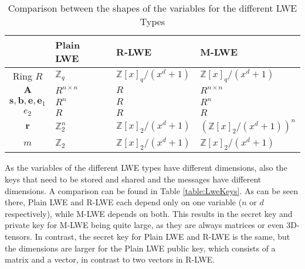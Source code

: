 \begin{table}[htbp]
  \caption[LWE variables shape comparison]{Comparison between the shapes of the variables for the different LWE Types}
  \label{table:LweDiffs}
  \centering
  \begin{tabular}{|c|l|l|l|}
    \hline
                                                    & Plain LWE        & R-LWE                     & M-LWE                         \\
    \hline
    Ring $R$                                        & $\mathbb{Z}_q$   & $\mathbb{Z}[x]_q/(x^d+1)$ & $\mathbb{Z}[x]_q/(x^d+1)$     \\
    $\textbf{A}$                                    & $R^{n\times n}$  & $R$                       & $R^{n\times n}$               \\
    $\textbf{s},\textbf{b},\textbf{e},\textbf{e}_1$ & $R^{n}$          & $R$                       & $R^{n}$                       \\
    $e_2$                                           & $R$              & $R$                       & $R$                           \\
    $\textbf{r}$                                    & $\mathbb{Z}_2^n$ & $\mathbb{Z}[x]_2/(x^d+1)$ & $(\mathbb{Z}[x]_2/(x^d+1))^n$ \\
    $m$                                             & $\mathbb{Z}_2$   & $\mathbb{Z}[x]_2/(x^d+1)$ & $\mathbb{Z}[x]_2/(x^d+1)$     \\
    \hline
  \end{tabular}
\end{table}

As the variables of the different LWE types have different dimensions, also the keys that need to be stored and shared and the messages have different dimensions. A comparison can be found in Table \ref{table:LweKeys}. As can be seen there, Plain LWE and R-LWE each depend only on one variable ($n$ or $d$ respectively), while M-LWE depends on both. This results in the secret key and private key for M-LWE being quite large, as they are always matrices or even 3D-tensors. In contrast, the secret key for Plain LWE and R-LWE is the same, but the dimensions are larger for the Plain LWE public key, which consists of a matrix and a vector, in contrast to two vectors in R-LWE.

